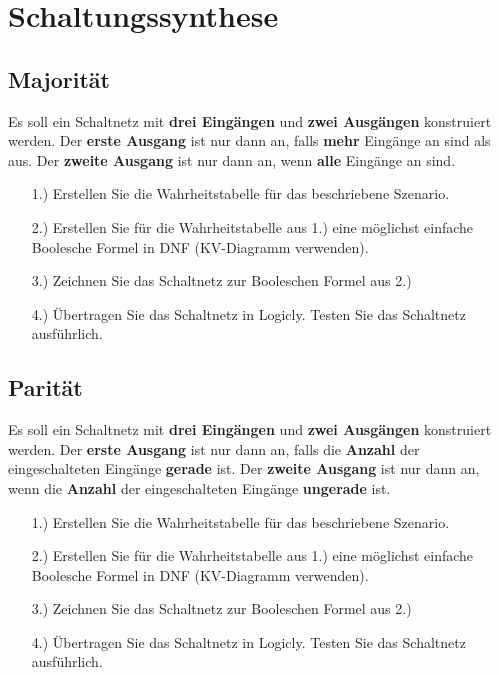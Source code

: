 
\part{Schaltungssynthese}
\label{part-schaltungssynthese}

\togglefalse{image}
\togglefalse{imagehover}

\chapter{Majorität}
\label{chapter-majoritaet}

\begin{exercise}
Es soll ein Schaltnetz mit \textbf{drei Eingängen} und \textbf{zwei Ausgängen} konstruiert werden. Der \textbf{erste Ausgang} ist nur dann an, falls \textbf{mehr} Eingänge an sind als aus. Der \textbf{zweite Ausgang} ist nur dann an, wenn \textbf{alle} Eingänge an sind.

\begin{enumerate}
\item[1.)] Erstellen Sie die Wahrheitstabelle für das beschriebene Szenario.
\item[2.)] Erstellen Sie für die Wahrheitstabelle aus 1.) eine möglichst einfache Boolesche Formel in \ac{DNF} (\ac{KV}-Diagramm verwenden).
\item[3.)] Zeichnen Sie das Schaltnetz zur Booleschen Formel aus 2.)
\item[4.)] Übertragen Sie das Schaltnetz in Logicly. Testen Sie das Schaltnetz ausführlich.
\end{enumerate}
\end{exercise}


\newpage

\chapter{Parität}
\label{chapter-paritaet}

\begin{exercise}
Es soll ein Schaltnetz mit \textbf{drei Eingängen} und \textbf{zwei Ausgängen} konstruiert werden. Der \textbf{erste Ausgang} ist nur dann an, falls die \textbf{Anzahl} der eingeschalteten Eingänge \textbf{gerade} ist. Der \textbf{zweite Ausgang} ist nur dann an, wenn die \textbf{Anzahl} der eingeschalteten Eingänge \textbf{ungerade} ist.

\begin{enumerate}
\item[1.)] Erstellen Sie die Wahrheitstabelle für das beschriebene Szenario.
\item[2.)] Erstellen Sie für die Wahrheitstabelle aus 1.) eine möglichst einfache Boolesche Formel in \ac{DNF} (\ac{KV}-Diagramm verwenden).
\item[3.)] Zeichnen Sie das Schaltnetz zur Booleschen Formel aus 2.)
\item[4.)] Übertragen Sie das Schaltnetz in Logicly. Testen Sie das Schaltnetz ausführlich.
\end{enumerate}
\end{exercise}


\newpage